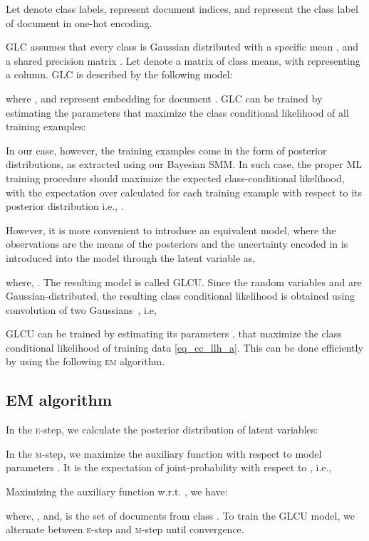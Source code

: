 \documentclass[journal]{IEEEtran}
\begin{document}
Let  denote class labels,  represent document indices, and  represent the class label of document  in one-hot encoding.


GLC assumes that every class is Gaussian distributed with a specific mean , and a shared precision matrix . Let  denote a matrix of class means, with  representing a column. GLC is described by the following model:

where ,  and  represent embedding for document . GLC can be trained by estimating the parameters  that maximize the class conditional likelihood of all training examples:

In our case, however, the training examples come in the form of posterior distributions,  as extracted using our Bayesian SMM. In such case, the proper ML training procedure should maximize the expected class-conditional likelihood, with the expectation over  calculated for each training example with respect to its posterior distribution  i.e., .

However, it is more convenient to introduce an equivalent model, where the 
observations are the means  of the posteriors  and 
the uncertainty encoded in  is introduced into the model 
through the latent variable  as,

where, .
The resulting model is called GLCU. Since the random variables  and 
 are Gaussian-distributed, the resulting
class conditional likelihood is obtained using convolution of two 
Gaussians~\cite{Bishop:2006:PRML}, i.e,

GLCU can be trained by estimating its parameters , that maximize 
the class conditional likelihood of training data \eqref{eq_cc_llh_a}. 
This can be done efficiently by using the following \textsc{em} algorithm. 

\subsection{EM algorithm}
In the \textsc{e}-step, we calculate the posterior distribution of latent 
variables: 


In the \textsc{m}-step, we maximize the auxiliary function  with respect to model parameters . It is the expectation of  joint-probability with respect to , i.e.,

Maximizing the auxiliary function  w.r.t. , we have:

where, , and, 
 is the set of documents from class .
To train the GLCU model, we alternate between \textsc{e}-step and \textsc{m}-step until convergence.
\end{document}
